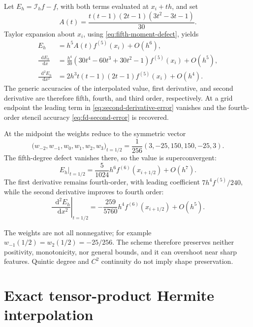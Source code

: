 \documentclass[11pt]{article}
\newcommand{\dd}{\mathop{}\!\mathrm{d}}
\newcommand{\I}{\mathcal{I}}
\begin{document}
Let $E_h=\I_h f-f$, with both terms evaluated at $x_i+th$, and set
\begin{equation}
  A(t)=\frac{t(t-1)(2t-1)(3t^2-3t-1)}{30}.
  \label{eq:A-def}
\end{equation}
Taylor expansion about $x_i$, using \eqref{eq:fifth-moment-defect}, yields
\begin{align}
  E_h&=h^5A(t)f^{(5)}(x_i)+O(h^6),
  \label{eq:value-error}\\
  \frac{\dd E_h}{\dd x}
  &=\frac{h^4}{30}
    (30t^4-60t^3+30t^2-1)f^{(5)}(x_i)+O(h^5),
  \label{eq:first-derivative-error}\\
  \frac{\dd^2E_h}{\dd x^2}
  &=2h^3t(t-1)(2t-1)f^{(5)}(x_i)+O(h^4).
  \label{eq:second-derivative-error}
\end{align}
The generic accuracies of the interpolated value, first derivative, and
second derivative are therefore fifth, fourth, and third order,
respectively.  At a grid endpoint the leading term in
\eqref{eq:second-derivative-error} vanishes and the fourth-order stencil
accuracy \eqref{eq:fd-second-error} is recovered.

At the midpoint the weights reduce to the symmetric vector
\begin{equation}
  \bigl(w_{-2},w_{-1},w_0,w_1,w_2,w_3\bigr)_{t=1/2}
  =\frac1{256}(3,-25,150,150,-25,3).
  \label{eq:midpoint-weights}
\end{equation}
The fifth-degree defect vanishes there, so the value is superconvergent:
\begin{equation}
  E_h\big|_{t=1/2}
  =\frac{5}{1024}h^6f^{(6)}(x_{i+1/2})+O(h^7).
  \label{eq:midpoint-value-error}
\end{equation}
The first derivative remains fourth-order, with leading coefficient
$7h^4f^{(5)}/240$, while the second derivative improves to fourth order:
\begin{equation}
  \left.\frac{\dd^2E_h}{\dd x^2}\right|_{t=1/2}
  =-\frac{259}{5760}h^4f^{(6)}(x_{i+1/2})+O(h^5).
  \label{eq:midpoint-second-error}
\end{equation}

The weights are not all nonnegative; for example
$w_{-1}(1/2)=w_2(1/2)=-25/256$.  The scheme therefore preserves neither
positivity, monotonicity, nor general bounds, and it can overshoot near sharp
features.  Quintic degree and $C^2$ continuity do not imply shape
preservation.

\section{Exact tensor-product Hermite interpolation}
\label{sec:exact-tensor}
\end{document}
